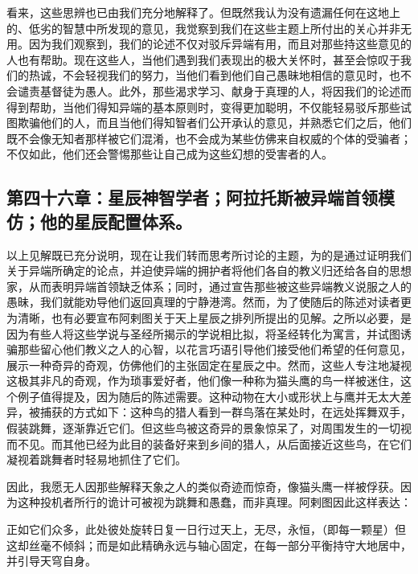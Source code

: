 看来，这些思辨也已由我们充分地解释了。但既然我认为没有遗漏任何在这地上的、低劣的智慧中所发现的意见，我觉察到我们在这些主题上所付出的关心并非无用。因为我们观察到，我们的论述不仅对驳斥异端有用，而且对那些持这些意见的人也有帮助。现在这些人，当他们遇到我们表现出的极大关怀时，甚至会惊叹于我们的热诚，不会轻视我们的努力，当他们看到他们自己愚昧地相信的意见时，也不会谴责基督徒为愚人。此外，那些渴求学习、献身于真理的人，将因我们的论述而得到帮助，当他们得知异端的基本原则时，变得更加聪明，不仅能轻易驳斥那些试图欺骗他们的人，而且当他们得知智者们公开承认的意见，并熟悉它们之后，他们既不会像无知者那样被它们混淆，也不会成为某些仿佛来自权威的个体的受骗者；不仅如此，他们还会警惕那些让自己成为这些幻想的受害者的人。\par


\subsection{第四十六章：星辰神智学者；阿拉托斯被异端首领模仿；他的星辰配置体系。}

以上见解既已充分说明，现在让我们转而思考所讨论的主题，为的是通过证明我们关于异端所确定的论点，并迫使异端的拥护者将他们各自的教义归还给各自的思想家，从而表明异端首领缺乏体系；同时，通过宣告那些被这些异端教义说服之人的愚昧，我们就能劝导他们返回真理的宁静港湾。然而，为了使随后的陈述对读者更为清晰，也有必要宣布阿剌图关于天上星辰之排列所提出的见解。之所以必要，是因为有些人将这些学说与圣经所揭示的学说相比拟，将圣经转化为寓言，并试图诱骗那些留心他们教义之人的心智，以花言巧语引导他们接受他们希望的任何意见，展示一种奇异的奇观，仿佛他们的主张固定在星辰之中。然而，这些人专注地凝视这极其非凡的奇观，作为琐事爱好者，他们像一种称为猫头鹰的鸟一样被迷住，这个例子值得提及，因为随后的陈述需要。这种动物在大小或形状上与鹰并无太大差异，被捕获的方式如下：这种鸟的猎人看到一群鸟落在某处时，在远处挥舞双手，假装跳舞，逐渐靠近它们。但这些鸟被这奇异的景象惊呆了，对周围发生的一切视而不见。而其他已经为此目的装备好来到乡间的猎人，从后面接近这些鸟，在它们凝视着跳舞者时轻易地抓住了它们。\par

因此，我愿无人因那些解释天象之人的类似奇迹而惊奇，像猫头鹰一样被俘获。因为这种投机者所行的诡计可被视为跳舞和愚蠢，而非真理。阿剌图因此这样表达：\par

正如它们众多，此处彼处旋转\newline{}日复一日行过天上，无尽，永恒，（即每一颗星）\newline{}但这却丝毫不倾斜；而是如此精确\newline{}永远与轴心固定，在每一部分平衡\newline{}持守大地居中，并引导天穹自身。\par

